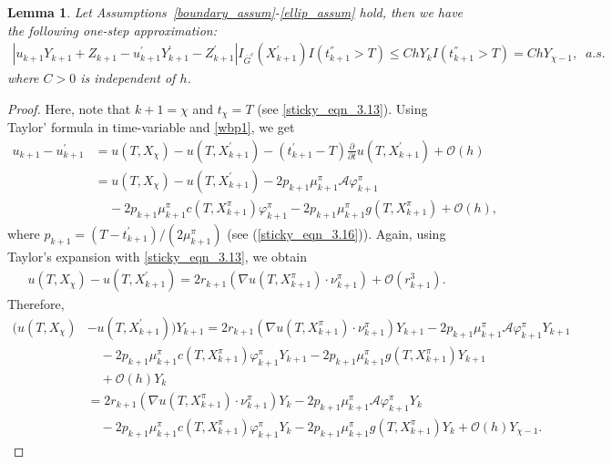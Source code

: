 \documentclass{article}
\newtheorem{lemma}[theorem]{Lemma}
\theoremstyle{definition}
\numberwithin{equation}{section}
\begin{document}
\begin{lemma}\label{sticky_lemma_4.4}
Let Assumptions~\ref{boundary_assum}-\ref{ellip_assum} hold, then we have the following one-step approximation:
\begin{align*}
|u_{k+1}Y_{k+1} + Z_{k+1} - u_{k+1}^{'}Y_{k+1}^{'} - Z_{k+1}^{'}   |I_{\bar{G}^{c}}(X_{k+1}^{'})I(t^{''}_{k+1} > T) \leq ChY_{k}I(t^{''}_{k+1} > T) = ChY_{\chi-1}, \;\;a.s.
\end{align*}
where $C > 0$ is independent of $h$.
\end{lemma}
\begin{proof}
Here, note that $k+1 =  \chi$ and $t_\chi = T$ (see \eqref{sticky_eqn_3.13}). Using Taylor' formula in time-variable and \eqref{wbp1}, we get
\begin{align}
    u_{k+1} - u^{'}_{k+1} & =  u(T, X_{\chi}) - u(T, X_{k+1}^{'}) - (t^{'}_{k+1} -T)\frac{\partial }{\partial t}u(T, X_{k+1}^{'})  + \mathcal{O}(h) \nonumber \\  &
    =  u(T, X_{\chi}) - u(T, X_{k+1}^{'}) - 2 p_{k+1}\mu^{\pi}_{k+1}\mathcal{A}\varphi^{\pi}_{k+1} \nonumber   \\  &  \;\;\;\; -  2 p_{k+1}\mu^{\pi}_{k+1} c(T, X^{\pi}_{k+1}) \varphi^{\pi}_{k+1} -  2 p_{k+1}\mu^{\pi}_{k+1} g(T, X^{\pi}_{k+1})   + \mathcal{O}(h), 
\end{align}
where $ p_{k+1} = (T-t^{'}_{k+1})/(2\mu_{k+1}^{\pi})$ (see (\ref{sticky_eqn_3.16})). 
Again, using Taylor's expansion with \eqref{sticky_eqn_3.13}, we obtain 
\begin{align}
    u(T, X_{\chi}) - u(T, X_{k+1}^{'}) = 2r_{k+1}(\nabla u(T, X^{\pi}_{k+1}) \cdot \nu_{k+1}^{\pi}) + \mathcal{O}(r_{k+1}^3). 
\end{align}
Therefore,
\begin{align}
    (u(T, X_{\chi}) &- u(T, X_{k+1}^{'}))Y_{k+1}   =    2r_{k+1}(\nabla u(T, X^{\pi}_{k+1}) \cdot \nu_{k+1}^{\pi})  Y_{k+1} -  2 p_{k+1}\mu^{\pi}_{k+1}\mathcal{A}\varphi^{\pi}_{k+1} Y_{k+1}
    \nonumber \\  & \quad  - 2 p_{k+1}\mu^{\pi}_{k+1} c(T, X^{\pi}_{k+1}) \varphi^{\pi}_{k+1}Y_{k+1} -  2 p_{k+1}\mu^{\pi}_{k+1} g(T, X^{\pi}_{k+1})Y_{k+1} \nonumber  \\  & \quad + \mathcal{O}(h)Y_{k} \nonumber  \\  & 
    = 2r_{k+1}(\nabla u(T, X^{\pi}_{k+1}) \cdot \nu_{k+1}^{\pi})  Y_{k} -  2 p_{k+1}\mu^{\pi}_{k+1}\mathcal{A}\varphi^{\pi}_{k+1} Y_{k}
    \nonumber \\  & \quad  - 2 p_{k+1}\mu^{\pi}_{k+1} c(T, X^{\pi}_{k+1}) \varphi^{\pi}_{k+1}Y_{k} -  2 p_{k+1}\mu^{\pi}_{k+1} g(T, X^{\pi}_{k+1})Y_{k} + \mathcal{O}(h)Y_{\chi-1}. \label{sticky_eqn_4.16}

\end{align}
\end{proof}
\end{document}
